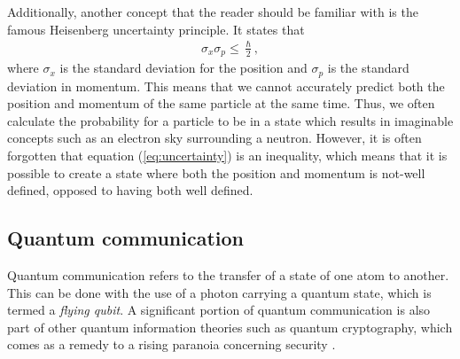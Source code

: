 Additionally, another concept that the reader should be familiar with is the famous Heisenberg uncertainty principle. It states that
\begin{align}
    \sigma_x \sigma_p \leq \frac{\hslash}{2},
    \label{eq:uncertainty}
\end{align}
where $\sigma_x$ is the standard deviation for the position and $\sigma_p$ is the standard deviation in momentum. This means that we cannot accurately predict both the position and momentum of the same particle at the same time. Thus, we often calculate the probability for a particle to be in a state which results in imaginable concepts such as an electron sky surrounding a neutron. However, it is often forgotten that equation (\ref{eq:uncertainty}) is an inequality, which means that it is possible to create a state where both the position and momentum is not-well defined, opposed to having both well defined.

\subsection{Quantum communication}

Quantum communication refers to the transfer of a state of one atom to another. This can be done with the use of a photon carrying a quantum state, which is termed a \textit{flying qubit}. A significant portion of quantum communication is also part of other quantum information theories such as quantum cryptography, which comes as a remedy to a rising paranoia concerning security \cite{Griffiths2002, Pavicic2006}.


